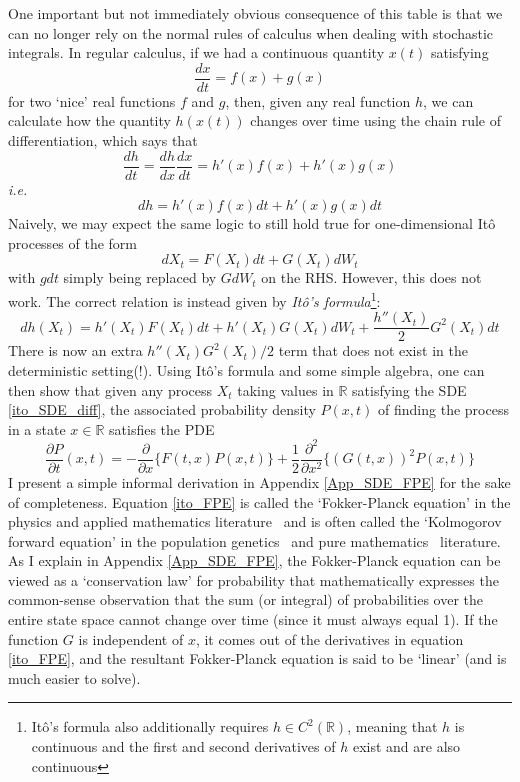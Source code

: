 One important but not immediately obvious consequence of this table is that we can no longer rely on the normal rules of calculus when dealing with stochastic integrals. In regular calculus, if we had a continuous quantity $x(t)$ satisfying
\begin{equation*}
	\frac{dx}{dt} = f(x) + g(x)
\end{equation*}
for two `nice' real functions $f$ and $g$, then, given any real function $h$, we can calculate how the quantity $h(x(t))$ changes over time using the chain rule of differentiation, which says that
\begin{equation*}
\frac{dh}{dt} = \frac{dh}{dx}\frac{dx}{dt} = h'(x)f(x) + h'(x)g(x)
\end{equation*}
\emph{i.e.}
\begin{equation*}
dh =  h'(x)f(x)dt + h'(x)g(x)dt
\end{equation*}
Naively, we may expect the same logic to still hold true for one-dimensional It\^o processes of the form
\begin{equation*}
dX_t = F(X_t)dt + G(X_t)dW_t
\end{equation*}
with $gdt$ simply being replaced by $GdW_t$ on the RHS. However, this does not work. The correct relation is instead given by 
\emph{It\^o's formula}\footnote{It\^o's formula also additionally requires $h \in C^2(\mathbb{R})$, meaning that $h$ is continuous and the first and second derivatives of $h$ exist and are also continuous}:
\begin{equation*}
dh(X_t) = h'(X_t)F(X_t)dt + h'(X_t)G(X_t)dW_t  + \frac{h''(X_t)}{2}G^2(X_t)dt 
\end{equation*}
There is now an extra $h''(X_t)G^2(X_t)/2$ term that does not exist in the deterministic setting(!). Using It\^o's formula and some simple algebra, one can then show that given any process $X_t$ taking values in $\mathbb{R}$ satisfying the SDE \eqref{ito_SDE_diff}, the associated probability density $P(x,t)$ of finding the process in a state $x \in \mathbb{R}$ satisfies the PDE
\begin{equation}
\label{ito_FPE}
\frac{\partial P}{\partial t}(x,t) = -\frac{\partial}{\partial x}\{F(t,x)P(x,t)\} + \frac{1}{2}\frac{\partial^2}{\partial x^2}\{(G(t,x))^2P(x,t)\}
\end{equation}
I present a simple informal derivation in Appendix \ref{App_SDE_FPE} for the sake of completeness. Equation \eqref{ito_FPE} is called the `Fokker-Planck equation' in the physics and applied mathematics literature~\citep{gardiner_stochastic_2009} and is often called the `Kolmogorov forward equation' in the population genetics~\citep{ewens_mathematical_2004} and pure mathematics~\citep{oksendal_stochastic_1998} literature. As I explain in Appendix \ref{App_SDE_FPE}, the Fokker-Planck equation can be viewed as a `conservation law' for probability that mathematically expresses the common-sense observation that the sum (or integral) of probabilities over the entire state space cannot change over time (since it must always equal 1). If the function $G$ is independent of $x$, it comes out of the derivatives in equation \eqref{ito_FPE}, and the resultant Fokker-Planck equation is said to be `linear' (and is much easier to solve).

